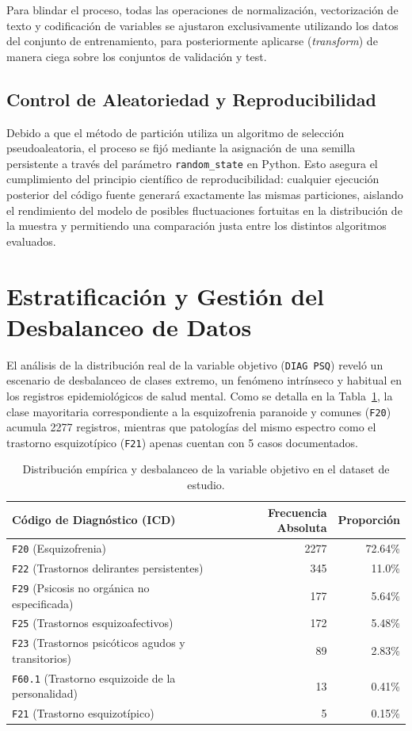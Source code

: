 \documentclass[12pt,a4paper,onecolumn,oneside]{report}
\begin{document}
Para blindar el proceso, todas las operaciones de normalización, vectorización de texto y codificación de variables se ajustaron exclusivamente utilizando los datos del conjunto de entrenamiento, para posteriormente aplicarse (\textit{transform}) de manera ciega sobre los conjuntos de validación y test.

\subsection{Control de Aleatoriedad y Reproducibilidad}
Debido a que el método de partición utiliza un algoritmo de selección pseudoaleatoria, el proceso se fijó mediante la asignación de una semilla persistente a través del parámetro \texttt{random\_state} en Python. Esto asegura el cumplimiento del principio científico de reproducibilidad: cualquier ejecución posterior del código fuente generará exactamente las mismas particiones, aislando el rendimiento del modelo de posibles fluctuaciones fortuitas en la distribución de la muestra y permitiendo una comparación justa entre los distintos algoritmos evaluados.
\section{Estratificación y Gestión del Desbalanceo de Datos}

El análisis de la distribución real de la variable objetivo (\texttt{DIAG PSQ}) reveló un escenario de desbalanceo de clases extremo, un fenómeno intrínseco y habitual en los registros epidemiológicos de salud mental. Como se detalla en la Tabla~\ref{tab:frecuencias_target}, la clase mayoritaria correspondiente a la esquizofrenia paranoide y comunes (\texttt{F20}) acumula 2277 registros, mientras que patologías del mismo espectro como el trastorno esquizotípico (\texttt{F21}) apenas cuentan con 5 casos documentados.

\begin{table}[htbp]
\centering
\small
\begin{tabular}{lrr}
\hline
\textbf{Código de Diagnóstico (ICD)} & \textbf{Frecuencia Absoluta} & \textbf{Proporción} \\ \hline
\texttt{F20} (Esquizofrenia) & 2277 & 72.64\% \\
\texttt{F22} (Trastornos delirantes persistentes) & 345 & 11.0\% \\
\texttt{F29} (Psicosis no orgánica no especificada) & 177 & 5.64\% \\
\texttt{F25} (Trastornos esquizoafectivos) & 172 & 5.48\% \\
\texttt{F23} (Trastornos psicóticos agudos y transitorios) & 89 & 2.83\% \\
\texttt{F60.1} (Trastorno esquizoide de la personalidad) & 13 & 0.41\% \\
\texttt{F21} (Trastorno esquizotípico) & 5 & 0.15\% \\ \hline
\end{tabular}
\caption{Distribución empírica y desbalanceo de la variable objetivo en el dataset de estudio.}
\label{tab:frecuencias_target}
\end{table}
\end{document}
